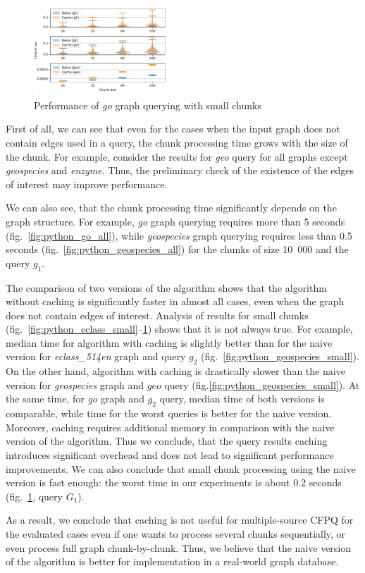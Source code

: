 \begin{figure}[h]
\centering
\includegraphics[width=0.45\textwidth]{data/raw/go_4.pdf}
\caption{Performance of \textit{go} graph querying with small chunks}
\label{fig:python_go_small}
\end{figure}


First of all, we can see that even for the cases when the input graph does not contain edges used in a query, the chunk processing time grows with the size of the chunk.
For example, consider the results for \textit{geo} query for all graphs except \textit{geospecies} and \textit{enzyme}.
Thus, the preliminary check of the existence of the edges of interest may improve performance.

We can also see, that the chunk processing time significantly depends on the graph structure.
For example, \textit{go} graph querying requires more than 5 seconds (fig.~\ref{fig:python_go_all}), while \textit{geospecies} graph querying requires less than 0.5 seconds (fig.~\ref{fig:python_geospecies_all}) for the chunks of size 10~000 and the query $g_1$.

The comparison of two versions of the algorithm shows that the algorithm without caching is significantly faster in almost all cases, even when the graph does not contain edges of interest.
Analysis of results for small chunks (fig.~\ref{fig:python_eclass_small}--\ref{fig:python_go_small}) shows that it is not always true.
For example, median time for algorithm with caching is slightly better than for the naive version for \textit{eclass\_514en} graph and query $g_2$ (fig.~\ref{fig:python_geospecies_small}).
On the other hand, algorithm with caching is drastically slower than the naive version for \textit{geospecies} graph and $geo$ query (fig.\ref{fig:python_geospecies_small}).
At the same time, for \textit{go} graph and $g_2$ query, median time of both versions is comparable, while time for the worst queries is better for the naive version.
Moreover, caching requires additional memory in comparison with the naive version of the algorithm.
Thus we conclude, that the query results caching introduces significant overhead and does not lead to significant performance improvements.
We can also conclude that small chunk processing using the naive version is fast enough: the worst time in our experiments is about 0.2 seconds (fig.~\ref{fig:python_go_small}, query $G_1$).


As a result, we conclude that caching is not useful for multiple-source CFPQ for the evaluated cases even if one wants to process several chunks sequentially, or even process full graph chunk-by-chunk.
Thus, we believe that the naive version of the algorithm is better for implementation in a real-world graph database.




